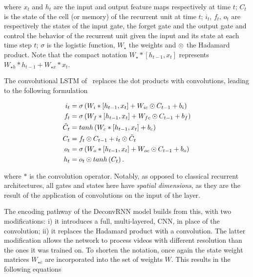 \noindent where $x_t$ and $h_t$ are the input and output feature maps
respectively at time $t$; $C_t$ is the state of the cell (or memory) of the
recurrent unit at time $t$; $i_t$, $f_t$, $o_t$ are respectively the states of
the input gate, the forget gate and the output gate and control the behavior of
the recurrent unit given the input and its state at each time step $t$;
$\sigma$ is the logistic function, $W_{\star}$ the weights
and $\odot$ the Hadamard product. Note that the compact notation
$W_\star * [h_{t-1}, x_t]$ represents $W_{\star h} * h_{t-1} + W_{\star x} *
x_t$.

The convolutional LSTM of~\cite{ShiCWYWW15} replaces the dot products with
convolutions, leading to the following formulation

\begin{equation}
\begin{split}
    i_t &= \sigma\left(W_i * \left[h_{t-1}, x_t\right] +
        W_{ic} \odot C_{t-1} + b_i \right)\\
    f_t &= \sigma\left(W_f * \left[h_{t-1}, x_t\right] +
        W_{fc} \odot C_{t-1} + b_f \right)\\
    \tilde C_t &= tanh \left(W_c * \left[h_{t-1}, x_t\right] + b_c \right)\\
    C_t &= f_t \odot C_{t-1} + i_t \odot \tilde C_t\\
    o_t &= \sigma\left(W_o * \left[h_{t-1}, x_t\right] +
        W_{oc} \odot C_{t-1} + b_o \right)\\
    h_t &= o_t \odot tanh \left(C_t\right).
\end{split}
\end{equation}

\noindent where $*$ is the convolution operator. Notably, as opposed to
classical recurrent architectures, all gates and states here have \emph{spatial
dimensions}, as they are the result of the application of convolutions on the
input of the layer.

The encoding pathway of the DeconvRNN model builds from this, with two
modifications: i) it introduces a full, multi-layered, CNN, in place of the
convolution; ii) it replaces the Hadamard product with a convolution. The
latter modification allows the network to process videos with different
resolution than the ones it was trained on. To shorten the notation, once again
the state weight matrices $W_{\star c}$ are incorporated into the set of
weights $W$. This results in the following equations

